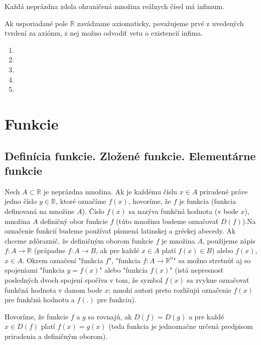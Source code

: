 \begin{veta}
Každá neprázdna zdola ohraničená množina reálnych čísel má infimum.
\end{veta}

Ak usporiadané pole $\mathbb{R}$ zavádzame axiomaticky, považujeme prvé z
uvedených tvrdení za axiómu, z nej možno odvodiť vetu o existencií infima.

\showanswers
\begin{enumerate}[resume]
  \item {}
  \hideanswers
  \item {}
  \item {}
  \item {}
  \item {}
\end{enumerate}

\section{Funkcie}
\subsection{Definícia funkcie. Zložené funkcie. Elementárne funkcie}

Nech $A\subset \mathbb{R}$ je neprázdna množina. Ak je každému číslu $x\in A$
priradené práve jedno číslo $y\in\mathbb{R}$, ktoré označíme $f(x)$, hovoríme,
že $f$ je funkcia (funkcia definovaná na množine $A$). Číslo $f(x)$ sa nazýva
funkčná hodnota (v bode $x$), množina $A$ definičný obor funkcie $f$ (túto
množinu budeme označovať $D(f)$).Na označenie funkcií budeme používať písmená
latinskej a gréckej abecedy. Ak chceme zdôraznič, že definičným oborom funkcie
$f$ je množina $A$, použijeme zápis $f:A \rightarrow \mathbb{R}$ (prápadne $f:A
\rightarrow B$, ak pre každé $x\in A$ platí $f(x)\in B$) alebo $f(x)$, $x\in
A$. Okrem označení "funkcia $f$", "funkcia $f:A \rightarrow \mathbb{R}^n$" sa
možno stretnúť aj so spojeniami "funkcia $y=f(x)$" alebo "funkcia $f(x)$" (istá
nepresnosť posledných dvoch spojení spočíva v tom, že symbol $f(x)$ sa zvykne
označovať funkčná hodnota v danom bode $x$; mnohí autori preto rozlišujú
označenie $f(x)$ pre funkčnú hodnotu a $f(.)$ pre funkciu).

Hovoríme, že funkcie $f$ a $g$ sa rovnajú, ak $D(f)=D(g)$ a pre každé $x\in
D(f)$ platí $f(x)=g(x)$ (teda funkcia je jednoznačne určená predpisom
priradenia a definičným oborom).

